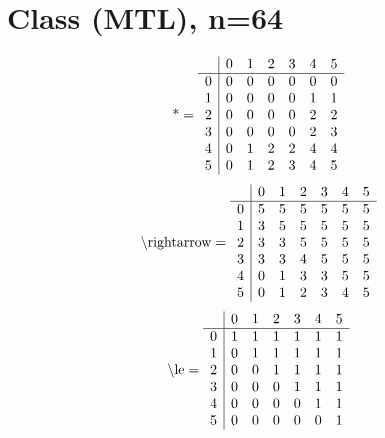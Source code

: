 \documentclass[11pt]{article}
\begin{document}
\section{Class (MTL), n=64}
\[\text{*} = 
\begin{array}{r | r r r r r r}
 & 0 & 1 & 2 & 3 & 4 & 5 \\ \hline
0 & 0 & 0 & 0 & 0 & 0 & 0 \\
1 & 0 & 0 & 0 & 0 & 1 & 1 \\
2 & 0 & 0 & 0 & 0 & 2 & 2 \\
3 & 0 & 0 & 0 & 0 & 2 & 3 \\
4 & 0 & 1 & 2 & 2 & 4 & 4 \\
5 & 0 & 1 & 2 & 3 & 4 & 5 \\
\end{array}
\]
\[\text{\textbackslash rightarrow} = 
\begin{array}{r | r r r r r r}
 & 0 & 1 & 2 & 3 & 4 & 5 \\ \hline
0 & 5 & 5 & 5 & 5 & 5 & 5 \\
1 & 3 & 5 & 5 & 5 & 5 & 5 \\
2 & 3 & 3 & 5 & 5 & 5 & 5 \\
3 & 3 & 3 & 4 & 5 & 5 & 5 \\
4 & 0 & 1 & 3 & 3 & 5 & 5 \\
5 & 0 & 1 & 2 & 3 & 4 & 5 \\
\end{array}
\]
\[\text{\textbackslash le} = 
\begin{array}{r | r r r r r r}
 & 0 & 1 & 2 & 3 & 4 & 5 \\ \hline
0 & 1 & 1 & 1 & 1 & 1 & 1 \\
1 & 0 & 1 & 1 & 1 & 1 & 1 \\
2 & 0 & 0 & 1 & 1 & 1 & 1 \\
3 & 0 & 0 & 0 & 1 & 1 & 1 \\
4 & 0 & 0 & 0 & 0 & 1 & 1 \\
5 & 0 & 0 & 0 & 0 & 0 & 1 \\
\end{array}
\]
\end{document}
